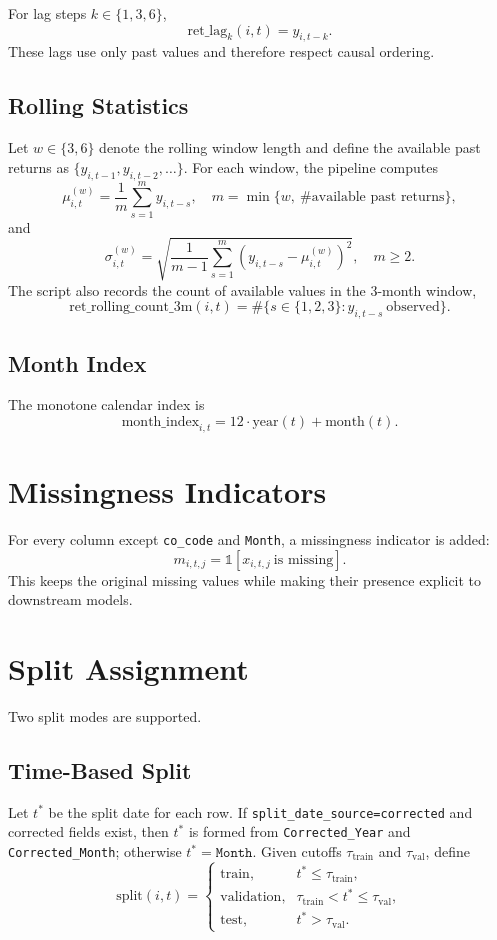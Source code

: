 \documentclass[11pt]{article}
\begin{document}
For lag steps $k \in \{1,3,6\}$,
\[
\text{ret\_lag}_{k}(i,t) = y_{i,t-k}.
\]
These lags use only past values and therefore respect causal ordering.

\subsection{Rolling Statistics}

Let $w \in \{3,6\}$ denote the rolling window length and define the available
past returns as $\{y_{i,t-1}, y_{i,t-2}, \dots\}$. For each window, the pipeline
computes
\[
\mu^{(w)}_{i,t} = \frac{1}{m} \sum_{s=1}^{m} y_{i,t-s},
\quad m = \min\{w,\ \#\text{available past returns}\},
\]
and
\[
\sigma^{(w)}_{i,t} = \sqrt{\frac{1}{m-1} \sum_{s=1}^{m} (y_{i,t-s}-\mu^{(w)}_{i,t})^2},
\quad m \ge 2.
\]
The script also records the count of available values in the 3-month window,
\[
\text{ret\_rolling\_count\_3m}(i,t) = \#\{s \in \{1,2,3\} : y_{i,t-s}\ \text{observed}\}.
\]

\subsection{Month Index}

The monotone calendar index is
\[
\text{month\_index}_{i,t} = 12 \cdot \text{year}(t) + \text{month}(t).
\]

\section{Missingness Indicators}

For every column except \texttt{co\_code} and \texttt{Month}, a missingness indicator
is added:
\[
m_{i,t,j} = \mathbb{1}[x_{i,t,j}\ \text{is missing}].
\]
This keeps the original missing values while making their presence explicit to
downstream models.

\section{Split Assignment}

Two split modes are supported.

\subsection{Time-Based Split}

Let $t^*$ be the split date for each row. If \texttt{split\_date\_source=corrected}
and corrected fields exist, then $t^*$ is formed from
\texttt{Corrected\_Year} and \texttt{Corrected\_Month}; otherwise $t^* = \texttt{Month}$.
Given cutoffs $\tau_{\text{train}}$ and $\tau_{\text{val}}$, define
\[
\text{split}(i,t) =
\begin{cases}
\text{train}, & t^* \le \tau_{\text{train}},\\
\text{validation}, & \tau_{\text{train}} < t^* \le \tau_{\text{val}},\\
\text{test}, & t^* > \tau_{\text{val}}.
\end{cases}
\]
\end{document}
